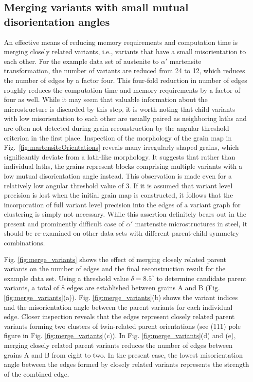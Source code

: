 \documentclass{elsarticle}
\numberwithin{equation}{section}
\begin{document}
\subsection{Merging variants with small mutual disorientation angles}
\label{sec:mergevariants}
An effective means of reducing memory requirements and computation time is merging closely related variants, i.e., variants that have a small misorientation to each other. For the example data set of austenite to $\alpha'$ martensite transformation, the number of variants are reduced from 24 to 12, which reduces the number of edges by a factor four. This four-fold reduction in number of edges roughly reduces the computation time and memory requirements by a factor of four as well. While it may seem that valuable information about the microstructure is discarded by this step, it is worth noting that child variants with low misorientation to each other are usually paired as neighboring laths and are often not detected during grain reconstruction by the angular threshold criterion in the first place. Inspection of the morphology of the grain map in Fig.~\ref{fig:martensiteOrientations} reveals many irregularly shaped grains, which significantly deviate from a lath-like morphology. It suggests that rather than individual laths, the grains represent blocks comprising multiple variants with a low mutual disorientation angle instead. This observation is made even for a relatively low angular threshold value of 3\textdegree. If it is assumed that variant level precision is lost when the initial grain map is constructed, it follows that the incorporation of full variant level precision into the edges of a variant graph for clustering is simply not necessary. While this assertion definitely bears out in the present and prominently difficult case of $\alpha'$ martensite microstructures in steel, it should be re-examined on other data sets with different parent-child symmetry combinations.

Fig. \ref{fig:merge_variants} shows the effect of merging closely related parent variants on the number of edges and the final reconstruction result for the example data set. Using a threshold value $\delta = 8.5^{\circ}$ to determine candidate parent variants, a total of 8 edges are established between grains A and B (Fig. \ref{fig:merge_variants}(a)). Fig. \ref{fig:merge_variants}(b) shows the variant indices and the misorientation angle between the parent variants for each individual edge. Closer inspection reveals that the edges represent closely related parent variants forming two clusters of twin-related parent orientations (see (111) pole figure in Fig. \ref{fig:merge_variants}(c)). In Fig. \ref{fig:merge_variants}(d) and (e), merging closely related parent variants reduces the number of edges between grains A and B from eight to two. In the present case, the lowest misorientation angle between the edges formed by closely related variants represents the strength of the combined edge.
\end{document}
